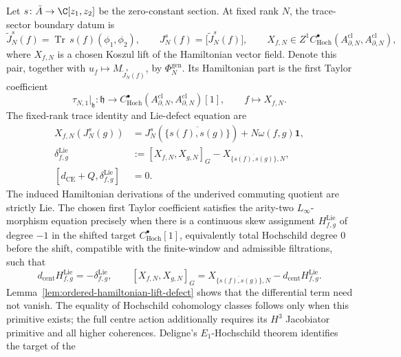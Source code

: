 \documentclass[11pt]{memoir}
\begin{document}
\begin{thm}\label{thm:trace-sector-generator-boundary-value}
  Let \(s\colon\bar A\to\C[z_1,z_2]\) be the zero-constant section.
  At fixed rank \(N\), the trace-sector boundary datum is
  \[
    \widetilde J_N^s(f)
      =\operatorname{Tr}\,s(f)(\phi_1,\phi_2),
    \qquad
    J_N^s(f)=\bigl[\widetilde J_N^s(f)\bigr],
    \qquad
    X_{f,N}\in Z^1C^\bullet_{\mathrm{Hoch}}
      (A^{\mathrm{cl}}_{\partial,N},A^{\mathrm{cl}}_{\partial,N}),
  \]
  where \(X_{f,N}\) is a chosen Koszul lift of the Hamiltonian vector
  field.  Denote this pair, together with
  \(u_f\mapsto M_{\widetilde J_N^s(f)}\), by
  \(\Phi_N^{\mathrm{gen}}\).  Its
  Hamiltonian part is the first Taylor coefficient
  \[
    \tau_{N,1}|_{\mathfrak h}\colon\mathfrak h\longrightarrow
    C^\bullet_{\mathrm{Hoch}}
      (A^{\mathrm{cl}}_{\partial,N},A^{\mathrm{cl}}_{\partial,N})[1],
    \qquad f\longmapsto X_{f,N}.
  \]
  The fixed-rank trace identity and Lie-defect equation are
  \[
    \begin{aligned}
      X_{f,N}(J_N^s(g))
        &=J_N^s\!\left(\overline{\{s(f),s(g)\}}\right)
          +N\omega(f,g)\mathbf1,\\
      \delta^{\mathrm{Lie}}_{f,g}
        &:=[X_{f,N},X_{g,N}]_G
          -X_{\overline{\{s(f),s(g)\}},N},\\
      [d_{\mathrm{CE}}+Q,\delta^{\mathrm{Lie}}_{f,g}]&=0.
    \end{aligned}
  \]
  The induced Hamiltonian derivations of the underived commuting
  quotient are strictly Lie.  The chosen first Taylor coefficient
  satisfies the arity-two \(L_\infty\)-morphism equation precisely when
  there is a continuous skew assignment
  \(H^{\mathrm{Lie}}_{f,g}\) of degree \(-1\) in the shifted target
  \(C^\bullet_{\mathrm{Hoch}}[1]\), equivalently total Hochschild degree
  \(0\) before the shift, compatible with the finite-window and
  admissible filtrations, such that
  \[
    d_{\mathrm{cent}}H^{\mathrm{Lie}}_{f,g}
      =-\delta^{\mathrm{Lie}}_{f,g},
    \qquad
    [X_{f,N},X_{g,N}]_G
      =X_{\overline{\{s(f),s(g)\}},N}
       -d_{\mathrm{cent}}H^{\mathrm{Lie}}_{f,g}.
  \]
  Lemma~\ref{lem:ordered-hamiltonian-lift-defect} shows that the
  differential term need not vanish.  The equality of Hochschild
  cohomology classes follows only when this primitive exists; the full
  centre action additionally requires its \(H^3\) Jacobiator primitive
  and all higher coherences.
  Deligne's \(E_1\)-Hochschild theorem identifies the target of the

\end{thm}
\end{document}

